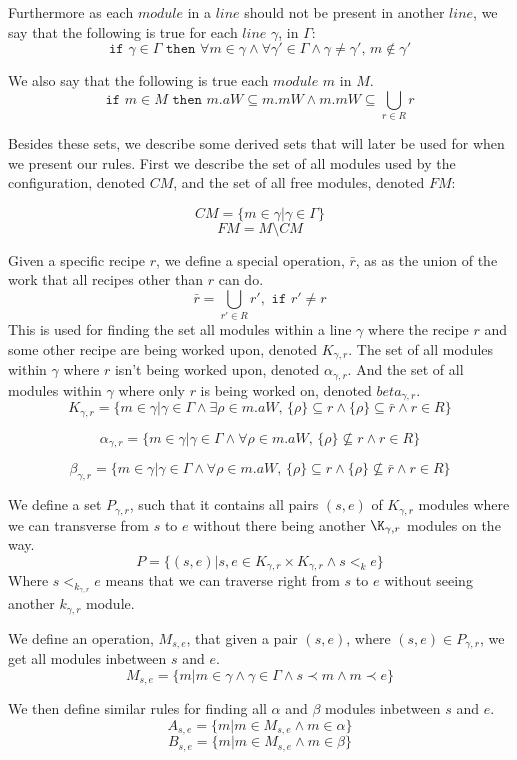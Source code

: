 Furthermore as each $module$ in a $line$ should not be present in another $line$, we say that the following is true for each $line$ $\gamma$, in $\Gamma$:
\[\texttt{if } \gamma \in \Gamma \texttt{ then } \forall m \in \gamma \land \forall \gamma ' \in \Gamma \land \gamma \neq \gamma ',\, m \notin \gamma ' \]

We also say that the following is true each $module$ $m$ in $M$.
\[\texttt{if } m \in M \texttt{ then } m.aW \subseteq m.mW \land m.mW \subseteq  \bigcup_{r\in R}r\] 


Besides these sets, we describe some derived sets that will later be used for when we present our rules. First we describe the set of all modules used by the configuration, denoted $CM$, and the set of all free modules, denoted $FM$:


\[CM = \{m \in \gamma | \gamma \in \Gamma \}\]
\[FM = M \setminus CM \]

Given a specific recipe $r$, we define a special operation, $\bar{r}$, as as the union of the work that all recipes other than $r$ can do. 
\[\bar{r} = \bigcup_{r' \in R}r', \texttt{ if } r' \neq r\]
This is used for finding the set all modules within a line $\gamma$ where the recipe $r$ and some other recipe are being worked upon, denoted $K_{\gamma ,r}$. The set of all modules within $\gamma$ where $r$ isn't being worked upon, denoted $\alpha_{\gamma ,r}$. And the set of all modules within $\gamma$ where only $r$ is being worked on, denoted $beta_{\gamma ,r}$. 
\[K_{\gamma ,r} = \{m \in \gamma | \gamma \in \Gamma \land \exists \rho \in m.aW,\, \{\rho\} \subseteq r \land \{\rho\} \subseteq \bar{r} \land r \in R\}\]

\[\alpha_{\gamma ,r}  = \{m \in \gamma | \gamma \in \Gamma \land \forall \rho \in m.aW,\, \{\rho\} \nsubseteq r \land r \in R\}\]

\[\beta_{\gamma ,r}  = \{m \in \gamma | \gamma \in \Gamma \land \forall \rho \in m.aW,\, \{\rho\} \subseteq r \land \{\rho\} \nsubseteq \bar{r} \land r \in R\}\]


We define a set $P_{\gamma ,r}$, such that it contains all pairs $(s, e)$ of $K_{\gamma ,r}$ modules where we can transverse from $s$ to $e$ without there being another $\K_{\gamma, r}$ modules on the way.
\[P = \{(s, e)| {s, e} \in K_{\gamma ,r} \times K_{\gamma ,r} \land s <_k  e\}\]
Where $s <_k_{\gamma ,r} e$ means that we can traverse right from $s$ to $e$ without seeing another $k_{\gamma, r}$ module. 

We define an operation, $M_{s,e}$, that given a pair $(s, e)$, where $(s, e) \in P_{\gamma ,r}$, we get all modules inbetween $s$ and $e$.
\[M_{s,e} = \{m | m \in \gamma \land \gamma \in \Gamma \land s \prec m \land m \prec e\}\]

We then define similar rules for finding all $\alpha$ and $\beta$ modules inbetween $s$ and $e$.
\[A_{s,e} = \{m |m \in M_{s,e} \land m \in \alpha\}\]
\[B_{s,e} = \{m |m \in M_{s,e} \land m \in \beta\}\]






